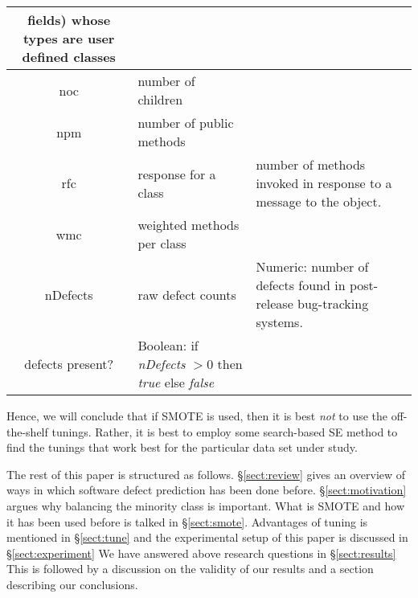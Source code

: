 \documentclass[sigconf,review, anonymous]{acmart}
\theoremstyle{break}
\newcommand{\tion}[1]{{\S}\ref{sect:#1}}
\begin{document}
\begin{figure*}[t!]
\begin{center}
{\begin{tabular}{c|l|p{4.0in}}
fields) whose types are user defined classes\\
\hline
noc & number of children &\\
\hline
npm & number of public methods & \\
\hline
rfc & response for a class &number of methods invoked in response to
a message to the object.\\
\hline
wmc & weighted methods per class &\\
\hline
\rowcolor{lightgray}
nDefects & raw defect counts & Numeric: number of defects found in post-release bug-tracking systems.\\
\rowcolor{lightgray}
defects present? & Boolean: if {\em nDefects} $>0$ then {\em true} else {\em false}
\end{tabular}
}
\end{center}
\caption{OO code metrics used for all studies in this paper.
Last lines, shown in \textcolor{gray} denote the dependent variables.}
\label{fig:ck}
\end{figure*}

Hence, we will conclude that if SMOTE is used,
then it is best {\em not} to use the off-the-shelf tunings. Rather, it is best to employ some search-based
SE method to find the tunings that work best for the
particular data set under study.

The rest of this paper is structured as follows.
\tion{review} gives an overview of ways in which software defect prediction has been done before. \tion{motivation} argues why balancing the minority class is important.
What is SMOTE and how it has been used before is talked in \tion{smote}. Advantages
of tuning is mentioned in \tion{tune}
and the experimental setup of this paper is discussed in \tion{experiment}
We have answered above research questions in
\tion{results} This is followed by a discussion on the validity of our results 
and a section describing our conclusions.


 


\end{document}
